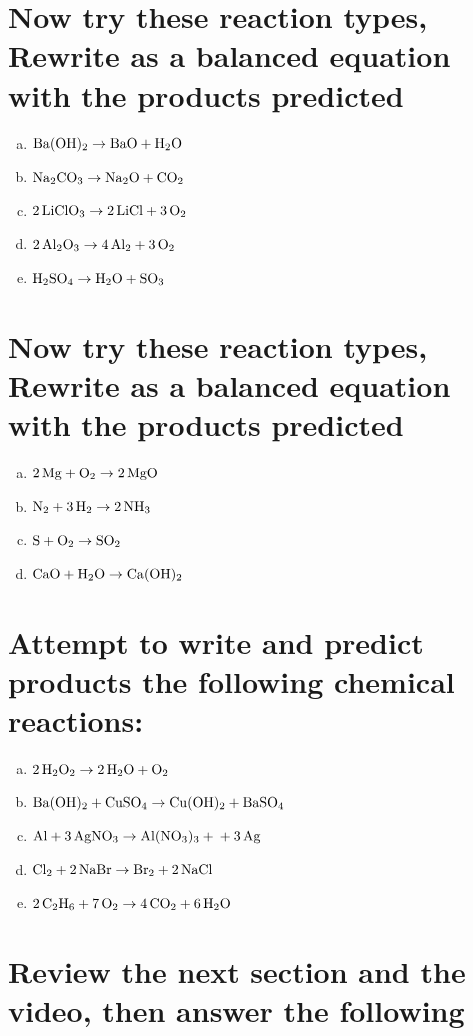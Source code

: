 \documentclass{scrartcl}
\begin{document}
\section{Now try these reaction types, Rewrite as a balanced equation with the products predicted}
\label{sec:org1209d39}
\begin{enumerate}[a.]
\item \(\ce{Ba(OH)2}\rightarrow\ce{BaO + H2O}\)
\item \(\ce{Na2CO3}\rightarrow\ce{Na2O + CO2}\)
\item \(\ce{2LiClO3}\rightarrow\ce{2LiCl + 3O2}\)
\item \(\ce{2Al2O3}\rightarrow\ce{4Al2 + 3O2}\)
\item \(\ce{H2SO4}\rightarrow\ce{H2O + SO3}\)
\end{enumerate}

\section{Now try these reaction types, Rewrite as a balanced equation with the products predicted}
\label{sec:orgdf2f2cf}
\begin{enumerate}[a.]
\item \(\ce{2Mg + O2}\rightarrow\ce{2MgO}\)
\item \(\ce{N2 + 3H2}\rightarrow\ce{2NH3}\)
\item \(\ce{S + O2}\rightarrow\ce{SO2}\)
\item \(\ce{CaO + H2O}\rightarrow\ce{Ca(OH)2}\)
\end{enumerate}

\section{Attempt to write and predict products the following chemical reactions:}
\label{sec:org5ac47e9}
\begin{enumerate}[a.]
\item \(\ce{2H2O2}\rightarrow\ce{2H2O + O2}\)
\item \(\ce{Ba(OH)2 + CuSO4}\rightarrow\ce{Cu(OH)2 + BaSO4}\)
\item \(\ce{Al + 3AgNO3}\rightarrow\ce{Al(NO3)3 + + 3Ag}\)
\item \(\ce{Cl2 + 2NaBr}\rightarrow\ce{Br2 + 2NaCl}\)
\item \(\ce{2C2H6 + 7O2}\rightarrow\ce{4CO2 + 6H2O}\)
\end{enumerate}

\section{Review the next section and the video, then answer the following}
\label{sec:org28f60ee}
\end{document}
